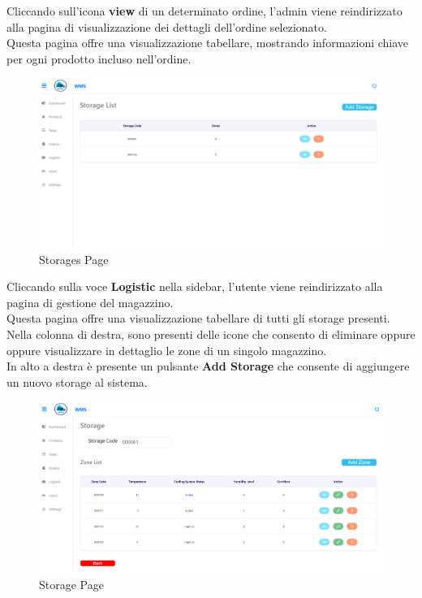 Cliccando sull'icona \textbf{view} di un determinato ordine, l’admin viene
reindirizzato alla pagina di visualizzazione dei dettagli dell'ordine selezionato.\\
Questa pagina offre una visualizzazione tabellare, mostrando informazioni chiave per ogni prodotto
incluso nell'ordine.

\begin{figure}[H]
    \centering
    \includegraphics[width=\textwidth]{document/sections/img/Storyboard/storagePage.png}
    \caption{Storages Page}
    \label{fig:storagesPage}
\end{figure}

Cliccando sulla voce \textbf{Logistic} nella sidebar, l'utente viene reindirizzato alla pagina di gestione del magazzino.\\
Questa pagina offre una visualizzazione tabellare di tutti gli storage presenti.\\
Nella colonna di destra, sono presenti delle icone che consento di eliminare oppure oppure visualizzare in dettaglio
le zone di un singolo magazzino.\\
In alto a destra è presente un pulsante \textbf{Add Storage} che consente di aggiungere un nuovo storage al sistema.

\begin{figure}[H]
    \centering
    \includegraphics[width=\textwidth]{document/sections/img/Storyboard/viewStorage.png}
    \caption{Storage Page}
    \label{fig:storagePage}
\end{figure}

